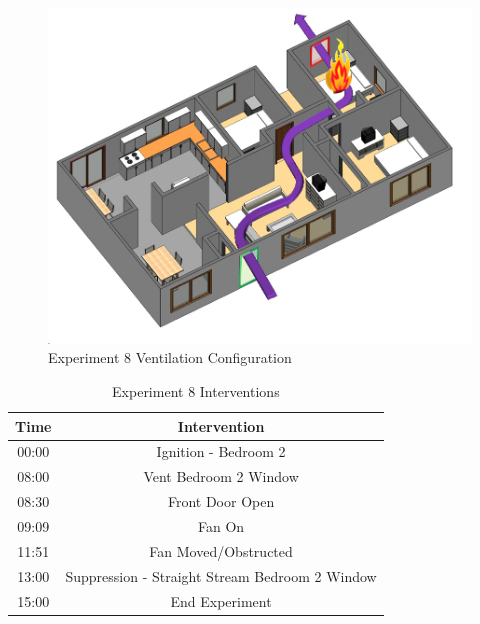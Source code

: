 \documentclass{article}
\begin{document}
\begin{figure}[h!]
	\centering
	\includegraphics[width=5in]{0_Images/FireExperiments/Single_Story/Experiment_8.jpg}
	\caption{Experiment 8 Ventilation Configuration}
	\label{fig:Exp8VentConfig}
\end{figure}

\begin{table}[H]
	\centering
	\caption{Experiment 8 Interventions}
	\begin{tabular}{|c|c|} 
		\hline
		Time & Intervention \\ \hline \hline
		00:00 & Ignition - Bedroom 2\\ \hline
		08:00 & Vent Bedroom 2 Window\\ \hline
		08:30 & Front Door Open \\ \hline
		09:09 & Fan On \\ \hline
		11:51 & Fan Moved/Obstructed \\ \hline
		13:00 & Suppression - Straight Stream Bedroom 2 Window \\ \hline
		15:00 & End Experiment \\ \hline
	\end{tabular}
	\label{Table:Exp8Interventions}
\end{table}
\end{document}
